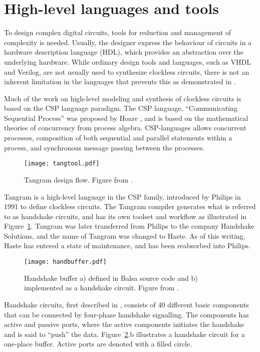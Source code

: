 \section{High-level languages and tools}
\label{sec:tools}

To design complex digital circuits, tools for reduction and management
of complexity is needed. Usually, the designer express the behaviour
of circuits in a hardware description language (HDL), which provides
an abstraction over the underlying hardware. While ordinary design
tools and languages, such as VHDL and Verilog, are not usually used to
synthesize clockless circuits, there is not an inherent limitation in
the languages that prevents this as demonstrated in
\cite[pp. 135-137]{sparso}.

Much of the work on high-level modeling and synthesis of clockless
circuits is based on the CSP language paradigm. The CSP language,
``Communicating Sequential Process'' was proposed by Hoare \cite{csp},
and is based on the mathematical theories of concurrency from process
algebra. CSP-languages allows concurrent processes, composition of
both sequential and parallel statements within a process, and
synchronous message passing between the processes.

\begin{figure}[htbp]
  \centering
  \texttt{[image: tangtool.pdf]}
  \caption{Tangram design flow. Figure from \cite{fullscan}.}
  \label{fig:tangtool}
\end{figure}

Tangram is a high-level language in the CSP family, introduced by
Philips in 1991 to define clockless circuits. The Tangram compiler
generates what is referred to as handshake circuits, and has its own
toolset and workflow as illustrated in
Figure~\ref{fig:tangtool}. Tangram was later transferred from Philips
to the company Handshake Solutions, and the name of Tangram was
changed to Haste. As of this writing, Haste has entered a state of
maintenance, and has been reabsorbed into Philips.

\begin{figure}[htbp]
  \centering
  \texttt{[image: handbuffer.pdf]}
  \caption{Handshake buffer a) defined in Balsa source code and b)
    implemented as a handshake circuit. Figure from
    \cite{taylor2008automatic}.}
  \label{fig:handbuffer}
\end{figure}

Handshake circuits, first described in \cite{hs}, consists of 40
different basic components that can be connected by four-phase
handshake signalling. The components has active and passive ports,
where the active components initiates the handshake and is said to
``push'' the data. Figure~\ref{fig:handbuffer}.b illustrates a
handshake circuit for a one-place buffer. Active ports are denoted
with a filled circle.


